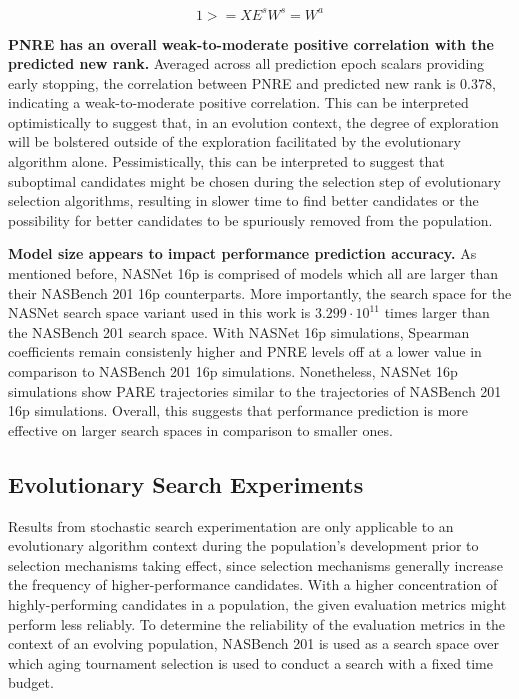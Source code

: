 \documentclass[twocolumn]{article}
\begin{document}
\[1 >= XE^{s}W^{s} = W^{a}\]

\textbf{PNRE has an overall weak-to-moderate positive correlation with the predicted new rank.}
Averaged across all prediction epoch scalars providing early stopping, the correlation between PNRE and predicted new rank is $0.378$,
indicating a weak-to-moderate positive correlation. 
This can be interpreted optimistically to suggest that, in an evolution context, the degree of exploration will be bolstered
outside of the exploration facilitated by the evolutionary algorithm alone. 
Pessimistically, this can be interpreted to suggest that suboptimal candidates might be chosen during the selection step of
evolutionary selection algorithms, resulting in slower time to find better candidates or the possibility for better candidates
to be spuriously removed from the population.

\textbf{Model size appears to impact performance prediction accuracy.} 
As mentioned before, NASNet 16p is comprised of models which all are larger than their NASBench 201 16p counterparts.
More importantly, the search space for the NASNet search space variant used in this work is $3.299\cdot10^{11}$ times larger than the NASBench 201 search space.
With NASNet 16p simulations, Spearman coefficients remain consistenly higher and PNRE levels off at a lower value in comparison to NASBench 201 16p simulations.
Nonetheless, NASNet 16p simulations show PARE trajectories similar to the trajectories of NASBench 201 16p simulations.
Overall, this suggests that performance prediction is more effective on larger search spaces in comparison to smaller ones.

\subsection{Evolutionary Search Experiments}

Results from stochastic search experimentation are only applicable to an evolutionary algorithm context during the population's development prior to 
selection mechanisms taking effect, since selection mechanisms generally increase the frequency of higher-performance candidates. 
With a higher concentration of highly-performing candidates in a population, the given evaluation metrics might perform less reliably.
To determine the reliability of the evaluation metrics in the context of an evolving population, NASBench 201 is used as a search space
over which aging tournament selection \cite{amoebanet} is used to conduct a search with a fixed time budget.
\end{document}
